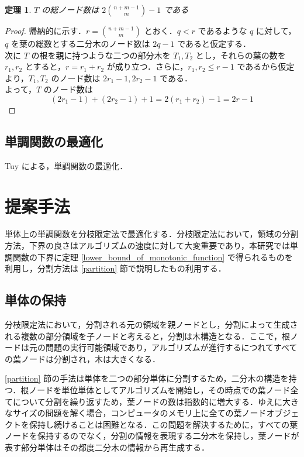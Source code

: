 \documentclass[a4paper,11pt]{jreport}
\newtheorem{theorem}{定理}
\begin{document}
\begin{theorem}
$ T $ の総ノード数は $ 2 \binom{n + m - 1}{m} - 1 $ である
\end{theorem}
\begin{proof}
帰納的に示す．$ r = \binom{n + m - 1}{m} $ とおく．$ q < r $ であるような $ q $ に対して，$ q $ を葉の総数とする二分木のノード数は $ 2q - 1 $ であると仮定する．\\
次に $ T $ の根を親に持つような二つの部分木を $ T_1, T_2 $ とし，それらの葉の数を $ r_1, r_2 $ とすると，$ r = r_1 + r_2 $ が成り立つ．さらに，$ r_1, r_2 \leq r - 1 $ であるから仮定より，$ T_1, T_2 $ のノード数は $ 2r_1 - 1, 2r_2 - 1 $ である．\\
よって，$ T $ のノード数は
$$ (2r_1 - 1) + (2r_2 - 1) + 1 = 2(r_1 + r_2) - 1 = 2r - 1 $$
\end{proof}

\section{単調関数の最適化}

Tuy による，単調関数の最適化．\par

\chapter{提案手法}

単体上の単調関数を分枝限定法で最適化する．分枝限定法において，領域の分割方法，下界の良さはアルゴリズムの速度に対して大変重要であり，本研究では単調関数の下界に定理  \ref{lower_bound_of_monotonic_function} で得られるものを利用し，分割方法は \ref{partition} 節で説明したもの利用する．\par

\section{単体の保持}

分枝限定法において，分割される元の領域を親ノードとし，分割によって生成される複数の部分領域を子ノードと考えると，分割は木構造となる．ここで，根ノードは元の問題の実行可能領域であり，アルゴリズムが進行するにつれてすべての葉ノードは分割され，木は大きくなる．\par
\ref{partition} 節の手法は単体を二つの部分単体に分割するため，二分木の構造を持つ．根ノードを単位単体としてアルゴリズムを開始し，その時点での葉ノード全てについて分割を繰り返すため，葉ノードの数は指数的に増大する．ゆえに大きなサイズの問題を解く場合，コンピュータのメモリ上に全ての葉ノードオブジェクトを保持し続けることは困難となる．この問題を解決するために，すべての葉ノードを保持するのでなく，分割の情報を表現する二分木を保持し，葉ノードが表す部分単体はその都度二分木の情報から再生成する．\par
\end{document}

